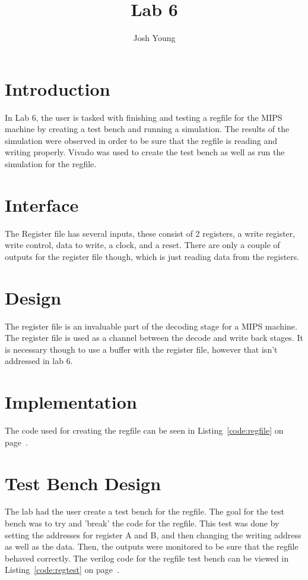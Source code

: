 \documentclass{article}
\author{Josh Young}
\title{Lab 6}
\newcommand{\Verilog}[3]{
  \lstset{language=Verilog}
  \lstset{backgroundcolor=\color{listinggray},rulecolor=\color{blue}}
  \lstset{linewidth=\textwidth}
  \lstset{commentstyle=\textit, stringstyle=\upshape,showspaces=false}
  \lstset{frame=tb}
  
}
\begin{document}
\maketitle

\section{Introduction}
In Lab 6, the user is tasked with finishing and testing a regfile for the MIPS machine by creating a test bench and running a simulation. The results of the simulation were observed in order to be sure that the regfile is reading and writing properly. Vivado was used to create the test bench as well as run the simulation for the regfile.

\section{Interface}
The Register file has several inputs, these consist of 2 registers, a write register, write control, data to write, a clock, and a reset. There are only a couple of outputs for the register file though, which is just reading data from the registers.

\section{Design}
The register file is an invaluable part of the decoding stage for a MIPS machine. The register file is used as a channel between the decode and write back stages. It is necessary though to use a buffer with the register file, however that isn't addressed in lab 6.

\section{Implementation}
The code used for creating the regfile can be seen in Listing~\ref{code:regfile} on page~\pageref{code:regfile}.

\Verilog{Verilog code for implementing a regfile.}{code:regfile}{../code/2_decode/regfile.v}

\section{Test Bench Design}
The lab had the user create a test bench for the regfile. The goal for the test bench was to try and 'break' the code for the regfile. This test was done by setting the addresses for register A and B, and then changing the writing address as well as the data. Then, the outputs were monitored to be sure that the regfile behaved correctly. The verilog code for the regfile test bench can be viewed in Listing~\ref{code:regtest} on page~\pageref{code:regtest}. 
\end{document}
